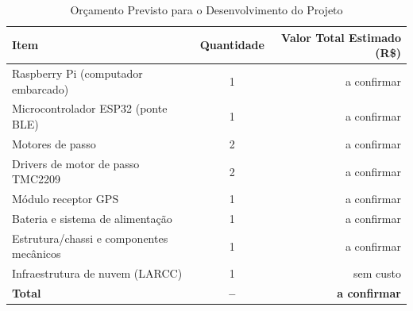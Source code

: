 \begin{table}[htb]
\centering
\caption{Orçamento Previsto para o Desenvolvimento do Projeto}
\label{tab:orcamento}
\begin{tabular}{|p{7.2cm}|c|r|}
\hline
\textbf{Item} & \textbf{Quantidade} & \textbf{Valor Total Estimado (R\$)} \\ \hline
Raspberry Pi (computador embarcado) & 1 & a confirmar \\ \hline
Microcontrolador ESP32 (ponte BLE) & 1 & a confirmar \\ \hline
Motores de passo & 2 & a confirmar \\ \hline
Drivers de motor de passo TMC2209 & 2 & a confirmar \\ \hline
Módulo receptor GPS & 1 & a confirmar \\ \hline
Bateria e sistema de alimentação & 1 & a confirmar \\ \hline
Estrutura/chassi e componentes mecânicos & 1 & a confirmar \\ \hline
Infraestrutura de nuvem (LARCC) & 1 & sem custo \\ \hline
\textbf{Total} & \textbf{--} & \textbf{a confirmar} \\ \hline
\end{tabular}
\end{table}

